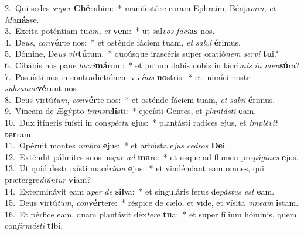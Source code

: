 {2.~}Qui sedes \textit{su}\textit{per} \textbf{Ché}rubim:~* manifestáre coram Ephraim, Bénja\textit{min}, \textit{et} \textit{Ma}\textbf{nás}se.\\
{3.~}Excita poténtiam tu\textit{am}, \textit{et} \textbf{ve}ni:~* ut sal\textit{vos} \textit{fá}\textit{ci}\textbf{as} nos.\\
{4.~}De\textit{us}, \textit{con}\textbf{vér}te nos:~* et osténde fáciem tuam, \textit{et} \textit{sal}\textit{vi} \textbf{é}rimus.\\
{5.~}Dómine, De\textit{us} \textit{vir}\textbf{tú}tum,~* quoúsque irascéris super oratió\textit{nem} \textit{ser}\textit{vi} \textbf{tu}i?\\
{6.~}Cibábis nos pane \textit{la}\textit{cri}\textbf{má}rum:~* et potum dabis nobis in lácri\textit{mis} \textit{in} \textit{men}\textbf{sú}ra?\\
{7.~}Posuísti nos in contradictiónem vi\textit{cí}\textit{nis} \textbf{no}stris:~* et inimíci nostri \textit{sub}\textit{san}\textit{na}\textbf{vé}runt nos.\\
{8.~}Deus virtú\textit{tum}, \textit{con}\textbf{vér}te nos:~* et osténde fáciem tuam, \textit{et} \textit{sal}\textit{vi} \textbf{é}rimus.\\
{9.~}Víneam de Ægýpto \textit{tran}\textit{stu}\textbf{lí}sti:~* ejecísti Gentes, et \textit{plan}\textit{tá}\textit{sti} \textbf{e}am.\\
{10.~}Dux itíneris fuísti in con\textit{spé}\textit{ctu} \textbf{e}jus:~* plantásti radíces ejus, et \textit{im}\textit{plé}\textit{vit} \textbf{ter}ram.\\
{11.~}Opéruit montes \textit{um}\textit{bra} \textbf{e}jus:~* et arbústa e\textit{jus} \textit{ce}\textit{dros} \textbf{De}i.\\
{12.~}Exténdit pálmites suos us\textit{que} \textit{ad} \textbf{ma}re:~* et usque ad flumen pro\textit{pá}\textit{gi}\textit{nes} \textbf{e}jus.\\
{13.~}Ut quid destruxísti macé\textit{ri}\textit{am} \textbf{e}jus:~* et vindémiant eam omnes, qui prætergre\textit{di}\textit{ún}\textit{tur} \textbf{vi}am?\\
{14.~}Exterminávit eam a\textit{per} \textit{de} \textbf{sil}va:~* et singuláris ferus de\textit{pá}\textit{stus} \textit{est} \textbf{e}am.\\
{15.~}Deus virtú\textit{tum}, \textit{con}\textbf{vér}tere:~* réspice de cælo, et vide, et vísita \textit{ví}\textit{ne}\textit{am} \textbf{i}stam.\\
{16.~}Et pérfice eam, quam plantávit déx\textit{te}\textit{ra} \textbf{tu}a:~* et super fílium hóminis, quem con\textit{fir}\textit{má}\textit{sti} \textbf{ti}bi.\\

